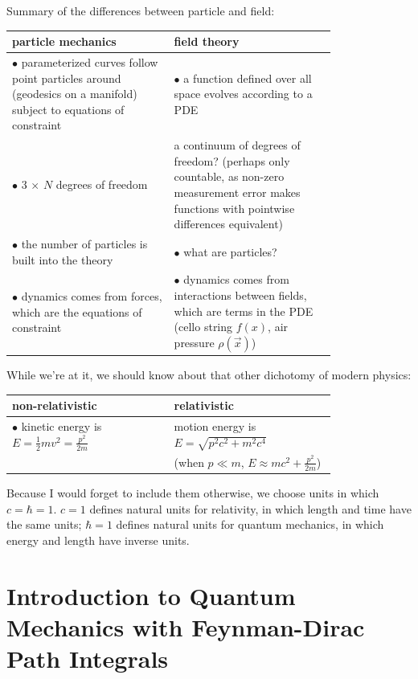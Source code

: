 \documentclass[12pt]{article}
\begin{document}
Summary of the differences between particle and field:
\begin{center}
  \begin{tabular}{p{0.4\linewidth} | p{0.4\linewidth}}
    particle mechanics & field theory \\\hline
    $\bullet$ parameterized curves follow point particles around
    (geodesics on a manifold) subject to equations of constraint &
    $\bullet$ a function defined over all space evolves according to a
    PDE \\
    $\bullet$ 3 $\times$ $N$ degrees of freedom & a continuum of
    degrees of freedom?  (perhaps only countable, as non-zero
    measurement error makes functions with pointwise differences
    equivalent) \\
    $\bullet$ the number of particles is built into the theory &
    $\bullet$ what are particles? \\
    $\bullet$ dynamics comes from forces, which are the equations of
    constraint & $\bullet$ dynamics comes from interactions between
    fields, which are terms in the PDE (cello string $f(x)$, air
    pressure $\rho(\vec{x})$)
  \end{tabular}
\end{center}

While we're at it, we should know about that other dichotomy of modern
physics:
\begin{center}
  \begin{tabular}{p{0.4\linewidth} | p{0.4\linewidth}}
    non-relativistic & relativistic \\\hline
    $\bullet$ kinetic energy is $E = \frac{1}{2} mv^2 =
    \frac{p^2}{2m}$ & motion energy is $E = \sqrt{p^2c^2 + m^2c^4}$ \\
    & (when $p \ll m$, $E \approx mc^2 + \frac{p^2}{2m}$) \\
  \end{tabular}
\end{center}

Because I would forget to include them otherwise, we choose units in
which $c = \hbar = 1$.  $c = 1$ defines natural units for relativity,
in which length and time have the same units; $\hbar = 1$ defines
natural units for quantum mechanics, in which energy and length have
inverse units.

\section{Introduction to Quantum Mechanics with Feynman-Dirac Path Integrals}
\end{document}
